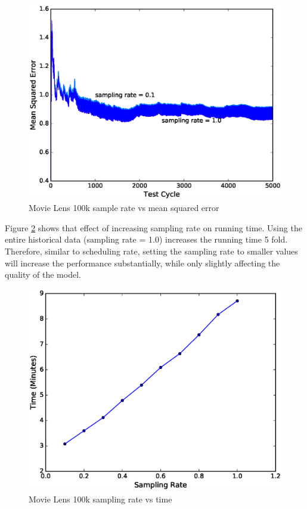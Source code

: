 \documentclass{sig-alternate-05-2015}
\begin{document}
\begin{figure}[H]
\centering
\includegraphics[width=\columnwidth]{../images/experiment-results/movie-lens-100k-sampling-rate.eps}
\caption{Movie Lens 100k sample rate vs mean squared error}
\label{fig:movie-lens-100k-sample-rate}
\end{figure}

Figure \ref{fig:movie-lens-100k-sample-rate-time} shows that effect of increasing sampling rate on running time.
Using the entire historical data (sampling rate = 1.0) increases the running time 5 fold. 
Therefore, similar to scheduling rate, setting the sampling rate to smaller values will increase the performance substantially, while only slightly affecting the quality of the model.


\begin{figure}[H]
\centering
\includegraphics[width=\columnwidth]{../images/experiment-results/movie-lens-100k-sampling-time.eps}
\caption{Movie Lens 100k sampling rate vs time}
\label{fig:movie-lens-100k-sample-rate-time}
\end{figure}
\end{document}
